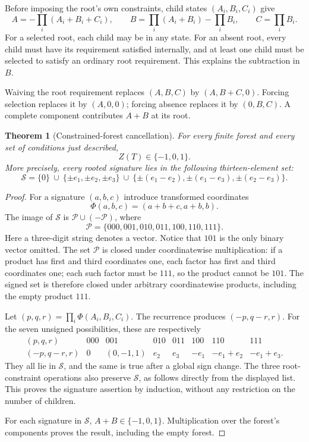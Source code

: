 \documentclass[11pt]{article}
\numberwithin{equation}{section}
\newtheorem{theorem}{Theorem}[section]
\theoremstyle{definition}
\newcommand{\calS}{\mathcal S}
\newcommand{\calP}{\mathcal P}
\begin{document}
Before imposing the root's own constraints, child states $(A_i,B_i,C_i)$
give
\begin{equation}\label{cb:eq:forestrec}
 A=-\prod_i(A_i+B_i+C_i),\qquad
 B=\prod_i(A_i+B_i)-\prod_iB_i,\qquad
 C=\prod_iB_i.
\end{equation}
For a selected root, each child may be in any state. For an absent root,
every child must have its requirement satisfied internally, and at least
one child must be selected to satisfy an ordinary root requirement. This
explains the subtraction in $B$.

Waiving the root requirement replaces $(A,B,C)$ by $(A,B+C,0)$.
Forcing selection replaces it by $(A,0,0)$; forcing absence replaces it by
$(0,B,C)$. A complete component contributes $A+B$ at its root.

\begin{theorem}[Constrained-forest cancellation]\label{cb:thm:forest}
For every finite forest and every set of conditions just described,
\[
 Z(T)\in\{-1,0,1\}.
\]
More precisely, every rooted signature lies in the following thirteen-element
set:
\begin{equation}\label{cb:eq:states}
 \calS=\{0\}\ \cup\ \{\pm e_1,\pm e_2,\pm e_3\}
 \ \cup\ \{\pm(e_1-e_2),\pm(e_1-e_3),\pm(e_2-e_3)\}.
\end{equation}
\end{theorem}
\begin{proof}
For a signature $(a,b,c)$ introduce transformed coordinates
\[
 \Phi(a,b,c)=(a+b+c,a+b,b).
\]
The image of $\calS$ is $\calP\cup(-\calP)$, where
\[
 \calP=\{000,001,010,011,100,110,111\}.
\]
Here a three-digit string denotes a vector. Notice that $101$ is the only
binary vector omitted. The set $\calP$ is closed under coordinatewise
multiplication: if a product has first and third coordinates one, each
factor has first and third coordinates one; each such factor must be $111$,
so the product cannot be $101$. The signed set is therefore closed under
arbitrary coordinatewise products, including the empty product $111$.

Let $(p,q,r)=\prod_i\Phi(A_i,B_i,C_i)$. The recurrence produces
$(-p,q-r,r)$. For the seven unsigned possibilities, these are respectively
\[
\begin{array}{c|rrrrrrr}
(p,q,r)&000&001&010&011&100&110&111\\\hline
(-p,q-r,r)&0&(0,-1,1)&e_2&e_3&-e_1&-e_1+e_2&-e_1+e_3.
\end{array}
\]
They all lie in $\calS$, and the same is true after a global sign change.
The three root-constraint operations also preserve $\calS$, as follows
directly from the displayed list. This proves the signature assertion by
induction, without any restriction on the number of children.

For each signature in $\calS$, $A+B\in\{-1,0,1\}$. Multiplication over
the forest's components proves the result, including the empty forest.
\end{proof}
\end{document}
